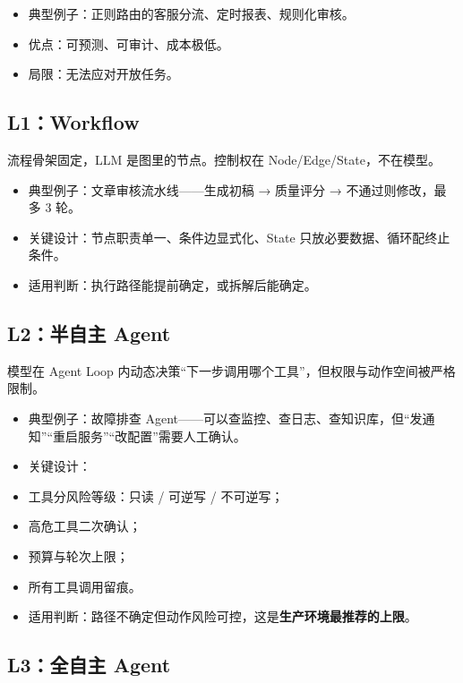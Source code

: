 \documentclass[9pt,a4paper,twocolumn]{ctexart}
\begin{document}
\begin{itemize}[itemsep=1pt, topsep=2pt]
  \item 典型例子：正则路由的客服分流、定时报表、规则化审核。
  \item 优点：可预测、可审计、成本极低。
  \item 局限：无法应对开放任务。
\end{itemize}


\subsection*{L1：Workflow}


流程骨架固定，LLM 是图里的节点。控制权在 Node/Edge/State，不在模型。


\begin{itemize}[itemsep=1pt, topsep=2pt]
  \item 典型例子：文章审核流水线——生成初稿 → 质量评分 → 不通过则修改，最多 3 轮。
  \item 关键设计：节点职责单一、条件边显式化、State 只放必要数据、循环配终止条件。
  \item 适用判断：执行路径能提前确定，或拆解后能确定。
\end{itemize}


\subsection*{L2：半自主 Agent}


模型在 Agent Loop 内动态决策“下一步调用哪个工具”，但权限与动作空间被严格限制。


\begin{itemize}[itemsep=1pt, topsep=2pt]
  \item 典型例子：故障排查 Agent——可以查监控、查日志、查知识库，但“发通知”“重启服务”“改配置”需要人工确认。
  \item 关键设计：
  \item 工具分风险等级：只读 / 可逆写 / 不可逆写；
  \item 高危工具二次确认；
  \item 预算与轮次上限；
  \item 所有工具调用留痕。
  \item 适用判断：路径不确定但动作风险可控，这是\textbf{生产环境最推荐的上限}。
\end{itemize}


\subsection*{L3：全自主 Agent}
\end{document}
